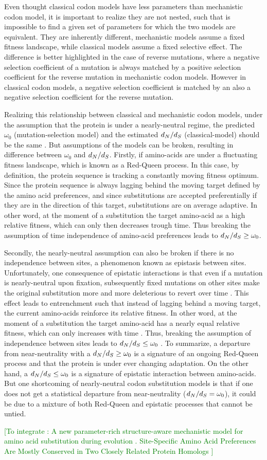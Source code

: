 Even thought classical codon models have less parameters than mechanistic codon model, it is important to realize they are not nested, such that is impossible to find a given set of parameters for which the two models are equivalent.
They are inherently different, mechanistic models assume a fixed fitness landscape, while classical models assume a fixed selective effect.
The difference is better highlighted in the case of reverse mutations, where a negative selection coefficient of a mutation is always matched by a positive selection coefficient for the reverse mutation in mechanistic codon models.
However in classical codon models, a negative selection coefficient is matched by an also a negative selection coefficient for the reverse mutation.

Realizing this relationship between classical and mechanistic codon models, under the assumption that the protein is under a nearly-neutral regime, the predicted $\omega_0$ (mutation-selection model) and the estimated $d_N / d_S$ (classical-model) should be the same \citep{Spielman2015, Spielman2016}.
But assumptions of the models can be broken, resulting in difference between $\omega_0$ and $d_N / d_S$.
Firstly, if amino-acids are under a fluctuating fitness landscape, which is known as a Red-Queen process.
In this case, by definition, the protein sequence is tracking a constantly moving fitness optimum.
Since the protein sequence is always lagging behind the moving target defined by the amino acid preferences, and since substitutions are accepted preferentially if they are in the direction of this target, substitutions are on average adaptive.
In other word, at the moment of a substitution the target amino-acid as a high relative fitness, which can only then decreases trough time.
Thus breaking the assumption of time independence of amino-acid preferences leads to $d_N / d_S \geq \omega_0$.

Secondly, the nearly-neutral assumption can also be broken if there is no independence between sites, a phenomenon known as epistasis between sites.
Unfortunately, one consequence of epistatic interactions is that even if a mutation is nearly-neutral upon fixation, subsequently fixed mutations on other sites make the original substitution more and more deleterious to revert over time \citep{Gong2014, Lunzer2010, Mccandlish2013}.
This effect leads to entrenchment such that instead of lagging behind a moving target, the current amino-acids reinforce its relative fitness.
In other word, at the moment of a substitution the target amino-acid has a nearly equal relative fitness, which can only increases with time \citep{Goldstein2016, Goldstein2017}.
Thus, breaking the assumption of independence between sites leads to $d_N / d_S \leq \omega_0$ \citep{Rodrigue2016}.
To summarize, a departure from near-neutrality with a $d_N / d_S \geq \omega_0$ is a signature of an ongoing Red-Queen process and that the protein is under ever changing adaptation.
On the other hand, a $d_N / d_S \leq \omega_0$ is a signature of epistatic interaction between amino-acids.
But one shortcoming of nearly-neutral codon substitution models is that if one does not get a statistical departure from near-neutrality ($d_N / d_S = \omega_0$), it could be due to a mixture of both Red-Queen and epistatic processes that cannot be untied.

\textcolor{GREEN}{[To integrate :
A new parameter-rich structure-aware mechanistic model for amino acid {substitution} during evolution \citep{Chi2018}.
Site-Specific Amino Acid Preferences Are Mostly Conserved in Two Closely Related Protein Homologs \citep{Doud2015}]}

